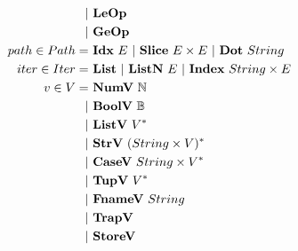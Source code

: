 \begin{align*}
    | & ~ \leop \\
    | & ~ \geop \\
%
  path \in Path =& ~ \idxp ~ E ~ | ~ \slicep ~ E \times E ~ | ~ \dotp ~ String \\
%
  iter \in Iter =& ~ \listiter ~ | ~ \listniter ~ E ~|~ \listidxiter ~ String \times E \\
%
  v \in V =& ~ \numv ~ \mathbb N \\
    | & ~ \boolv ~ \mathbb B \\
    | & ~ \listv ~ \seq V \\
    | & ~ \strv ~ \seq{(String \times V)} \\
    | & ~ \casev ~ String \times \seq V \\
    | & ~ \tupv ~ \seq V \\
    | & ~ \fnamev ~ String \\
    | & ~ \trapv \\
    | & ~ \storev \\
\end{align*}





\newpage

